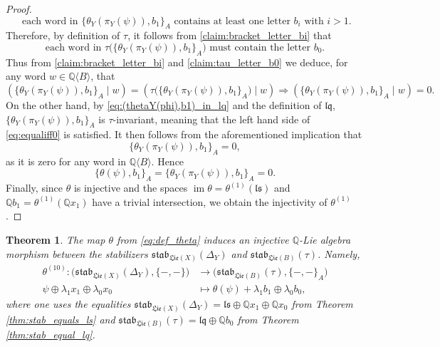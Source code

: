 \documentclass[11pt, a4paper]{amsart}
\newtheorem{theorem}{Theorem}[section]
\numberwithin{equation}{section}
\theoremstyle{definition}
\newcommand{\Q}{\mathbb{Q}}
\newcommand{\ls}{\mathfrak{ls}}
\newcommand{\QB}{\Q\langle B\rangle}
\newcommand{\lqq}{\mathfrak{lq}}
\newcommand{\Lie}{\mathfrak{Lie}}
\newcommand{\stab}{\mathfrak{stab}}
\begin{document}
\begin{proof}
\begin{equation}
    \text{ each word in } \{\theta_Y(\pi_Y(\psi)),b_1\}_A \text{ contains at least one letter } b_i \text{ with } i>1.    
\end{equation}
Therefore, by definition of $\tau$, it follows from \eqref{claim:bracket_letter_bi} that
\begin{equation} \label{claim:tau_letter_b0}
    \text{each word in } \tau\big(\{\theta_Y(\pi_Y(\psi)), b_1\}_A\big) \text{ must contain the letter } b_0.    
\end{equation}
Thus from \eqref{claim:bracket_letter_bi} and \eqref{claim:tau_letter_b0} we deduce, for any word $w \in \QB$, that
\begin{equation} \label{eq:equaliff0}
    (\{\theta_Y(\pi_Y(\psi)),b_1\}_A \mid w) = (\tau\big(\{\theta_Y(\pi_Y(\psi)), b_1\}_A\big) \mid w) \Longrightarrow (\{\theta_Y(\pi_Y(\psi)),b_1\}_A \mid w) = 0.
\end{equation}
On the other hand, by \eqref{eq:(thetaY(phi),b1)_in_lq} and the definition of $\lqq$, $\{\theta_Y(\pi_Y(\psi)),b_1\}_A$ is $\tau$-invariant, meaning that the left hand side of \eqref{eq:equaliff0} is satisfied. It then follows from the aforementioned implication that
\[
    \{\theta_Y(\pi_Y(\psi)),b_1\}_A = 0,    
\]
as it is zero for any word in $\QB$. Hence
\[\{\theta(\psi),b_1\}_A=\{\theta_Y(\pi_Y(\psi)), b_1\}_A=0.
\]
Finally, since $\theta$ is injective and the spaces $\operatorname{im} \theta = \theta^{(1)}(\ls)$ and $\Q b_1 = \theta^{(1)}(\Q x_1)$ have a trivial intersection, we obtain the injectivity of $\theta^{(1)}$.
\end{proof}

\begin{theorem} \label{thm:theta:stabDeltaY_to_stabtau} The map $\theta$ from \eqref{eq:def_theta} induces an injective $\Q$-Lie algebra morphism between the stabilizers $\stab_{\Lie(X)}(\Delta_Y)$ and $\stab_{\Lie(B)}(\tau)$. Namely,
\begin{align*}
\theta^{(10)} : \big(\stab_{\Lie(X)}(\Delta_Y), \{-, -\}\big) & \to \big(\stab_{\Lie(B)}(\tau), \{-, -\}_A\big) \\
\psi \oplus \lambda_1 x_1\oplus \lambda_0 x_0 & \mapsto \theta(\psi) + \lambda_1 b_1 \oplus \lambda_0 b_0,
\end{align*}
where one uses the equalities $\stab_{\Lie(X)}(\Delta_Y) = \ls \oplus \Q x_1 \oplus \Q x_0$ from Theorem \ref{thm:stab_equals_ls} and $\stab_{\Lie(B)}(\tau) = \lqq \oplus \Q b_0$ from Theorem \ref{thm:stab_equal_lq}.
\end{theorem}
\end{document}

